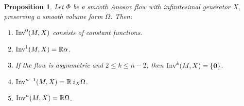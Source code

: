\documentclass[11pt,letterpaper,reqno,abstract=true]{scrartcl}
\theoremstyle{plain}                              %
\newtheorem{prop}[thm]{Proposition}
\theoremstyle{definition}                         %
\theoremstyle{remark}                             %
\newcommand{\R}{\mathbb{R}}                     %
\begin{document}
\begin{prop}   \label{prop:invariant}
  Let $\Phi$ be a smooth Anosov flow with infinitesimal generator
  $X$, preserving a smooth volume form $\Omega$. Then:

  \begin{enumerate}
  \item[(a)] $\text{\normalfont Inv}^0(M,X)$ consists of constant functions.
  \item[(b)] $\text{\normalfont Inv}^1(M,X) = \R \alpha$.
  \item[(c)] If the flow is asymmetric and $2 \leq k \leq n-2$, then
    $\text{\normalfont Inv}^k(M,X) = \{ \mathbf{0} \}$.
  \item[(d)] $\text{\normalfont Inv}^{n-1}(M,X) = \R \: i_X \Omega$.
  \item[(e)] $\text{\normalfont Inv}^n(M,X) = \R \Omega$.
  \end{enumerate}
  
\end{prop}
\end{document}

